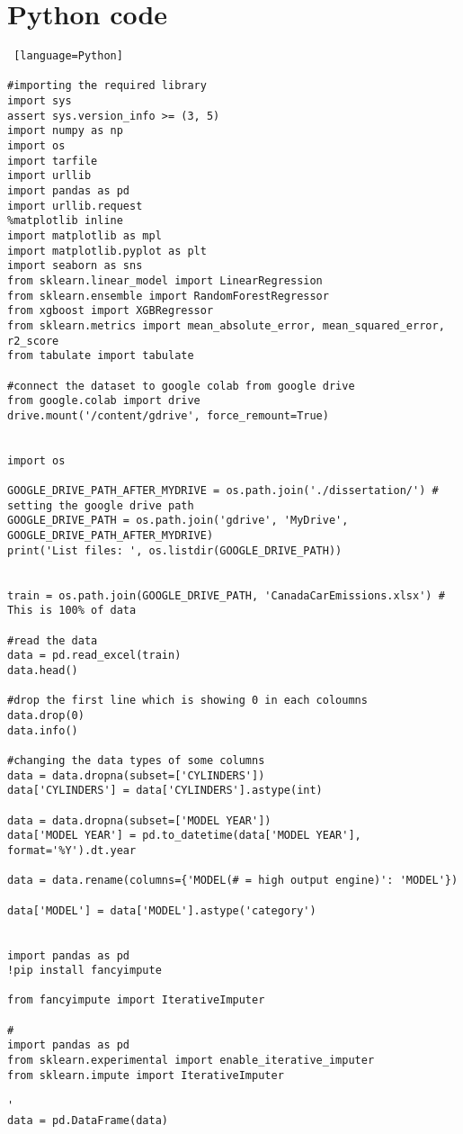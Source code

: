 \documentclass[12pt, a4paper,oneside]{book}
\numberwithin{equation}{section}
\begin{document}
\chapter{Python code}
\begin{lstlisting} [language=Python]

#importing the required library
import sys
assert sys.version_info >= (3, 5)
import numpy as np
import os
import tarfile
import urllib
import pandas as pd
import urllib.request
%matplotlib inline
import matplotlib as mpl
import matplotlib.pyplot as plt
import seaborn as sns
from sklearn.linear_model import LinearRegression
from sklearn.ensemble import RandomForestRegressor
from xgboost import XGBRegressor
from sklearn.metrics import mean_absolute_error, mean_squared_error, r2_score
from tabulate import tabulate

#connect the dataset to google colab from google drive
from google.colab import drive
drive.mount('/content/gdrive', force_remount=True)


import os

GOOGLE_DRIVE_PATH_AFTER_MYDRIVE = os.path.join('./dissertation/') # setting the google drive path
GOOGLE_DRIVE_PATH = os.path.join('gdrive', 'MyDrive', GOOGLE_DRIVE_PATH_AFTER_MYDRIVE)
print('List files: ', os.listdir(GOOGLE_DRIVE_PATH))


train = os.path.join(GOOGLE_DRIVE_PATH, 'CanadaCarEmissions.xlsx') # This is 100% of data

#read the data
data = pd.read_excel(train)
data.head()

#drop the first line which is showing 0 in each coloumns 
data.drop(0)
data.info()

#changing the data types of some columns 
data = data.dropna(subset=['CYLINDERS'])
data['CYLINDERS'] = data['CYLINDERS'].astype(int)

data = data.dropna(subset=['MODEL YEAR'])
data['MODEL YEAR'] = pd.to_datetime(data['MODEL YEAR'], format='%Y').dt.year

data = data.rename(columns={'MODEL(# = high output engine)': 'MODEL'})

data['MODEL'] = data['MODEL'].astype('category')


import pandas as pd
!pip install fancyimpute

from fancyimpute import IterativeImputer

#
import pandas as pd
from sklearn.experimental import enable_iterative_imputer
from sklearn.impute import IterativeImputer

'
data = pd.DataFrame(data)


\end{lstlisting}
\end{document}
